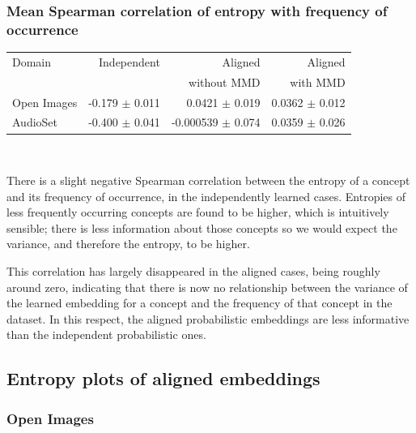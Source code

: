 \subsubsection{Mean Spearman correlation of entropy with frequency of occurrence}
\begin{table}[H]
\centering
\begin{tabular}{lrrr}
\toprule
Domain &   Independent & Aligned     &  Aligned  \\
       &               & without MMD &  with MMD \\
\midrule
Open Images    &  -0.179 $\pm$ 0.011 & 0.0421 $\pm$ 0.019 &     0.0362 $\pm$  0.012 \\
AudioSet    &  -0.400 $\pm$ 0.041 & -0.000539 $\pm$   0.074 &      0.0359  $\pm$ 0.026  \\
\bottomrule
\end{tabular}\\
\end{table}
There is a slight negative Spearman correlation between the entropy of a concept and its frequency of occurrence, in the independently learned cases. Entropies of less frequently occurring concepts are found to be higher, which is intuitively sensible; there is less information about those concepts so we would expect the variance, and therefore the entropy, to be higher. 

This correlation has largely disappeared in the aligned cases, being roughly around zero, indicating that there is now no relationship between the variance of the learned embedding for a concept and the frequency of that concept in the dataset. In this respect, the aligned probabilistic embeddings are less informative than the independent probabilistic ones. 
\subsection{Entropy plots of aligned embeddings}


\subsubsection{Open Images}

